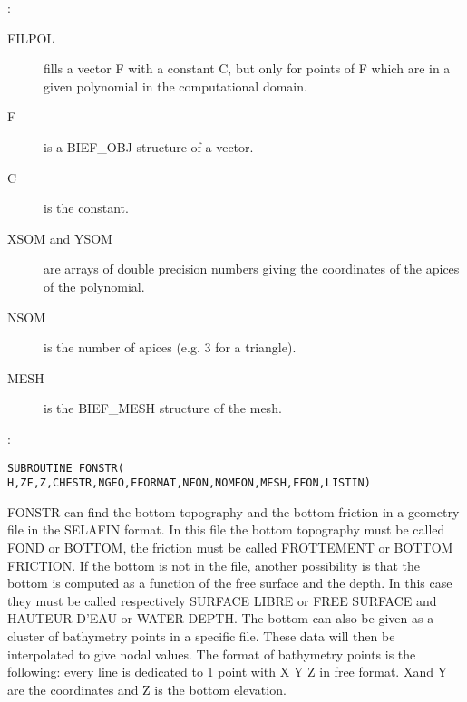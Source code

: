 :
\begin{description}
  \item [FILPOL] fills a vector F with a constant C, but only for points of F
    which are in a given polynomial in the computational domain.
  \item [F] is a BIEF\_OBJ structure of a vector.
  \item [C] is the constant.
  \item [XSOM and YSOM] are arrays of double precision numbers giving the
    coordinates of the apices of the polynomial.
  \item [NSOM] is the number of apices (e.g. 3 for a triangle).
  \item [MESH] is the BIEF\_MESH structure of the mesh.
\end{description}

%
%

:
\begin{lstlisting}[language=TelFortran]
SUBROUTINE FONSTR( H,ZF,Z,CHESTR,NGEO,FFORMAT,NFON,NOMFON,MESH,FFON,LISTIN)
\end{lstlisting}

FONSTR can find the bottom topography and the bottom friction in a geometry
file in the SELAFIN format. In this file the bottom topography must be called
FOND or BOTTOM, the friction must be called FROTTEMENT or BOTTOM FRICTION. If
the bottom is not in the file, another possibility is that the bottom is
computed as a function of the free surface and the depth. In this case they
must be called respectively SURFACE LIBRE or FREE SURFACE and HAUTEUR D'EAU or
WATER DEPTH. The bottom can also be given as a cluster of bathymetry points in
a specific file. These data will then be interpolated to give nodal values. The
format of bathymetry points is the following: every line is dedicated to 1
point with  X Y Z  in free format. Xand Y are the coordinates and Z is the
bottom elevation.

